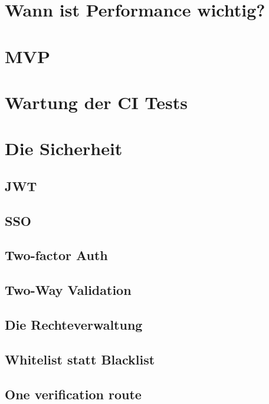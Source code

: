 \section{Wann ist Performance wichtig?}

\section{MVP}

\section{Wartung der CI Tests}

\section{Die Sicherheit}
\subsection{JWT}
\subsection{SSO}
\subsection{Two-factor Auth}
\subsection{Two-Way Validation}
\subsection{Die Rechteverwaltung}
\subsection{Whitelist statt Blacklist}
\subsection{One verification route}